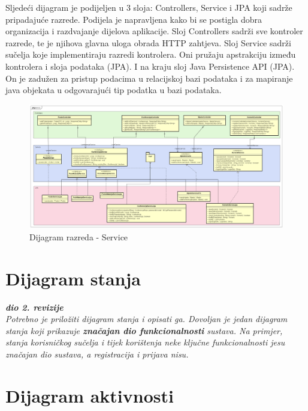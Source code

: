 		\newpage
		Sljedeći dijagram je podijeljen u 3 sloja: Controllers, Service i JPA koji sadrže pripadajuće razrede. Podijela je napravljena kako bi se postigla dobra organizacija i razdvajanje dijelova aplikacije. Sloj Controllers sadrži sve kontroler razrede, te je njihova glavna uloga obrada HTTP zahtjeva. Sloj Service sadrži sučelja koje implementiraju razredi kontrolera. Oni pružaju apstrakciju između kontrolera i sloja podataka (JPA). I na kraju sloj Java Persistence API (JPA). On je zadužen za pristup podacima u relacijskoj bazi podataka i za mapiranje java objekata u odgovarajući tip podatka u bazi podataka.
		\begin{figure}[H]
			\includegraphics[width=\textwidth]{slike/serviceClassDiagram.PNG} %
			\caption{Dijagram razreda - Service}
			\label{fig:dr-service} %
		\end{figure}







			\eject

		\section{Dijagram stanja}


			\textbf{\textit{dio 2. revizije}}\\

			\textit{Potrebno je priložiti dijagram stanja i opisati ga. Dovoljan je jedan dijagram stanja koji prikazuje \textbf{značajan dio funkcionalnosti} sustava. Na primjer, stanja korisničkog sučelja i tijek korištenja neke ključne funkcionalnosti jesu značajan dio sustava, a registracija i prijava nisu. }


			\eject

		\section{Dijagram aktivnosti}

